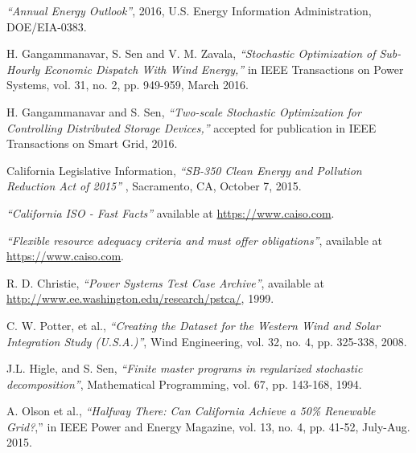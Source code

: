 \newpage
\begin{thebibliography}{9}

    \emph{``Annual Energy Outlook''}, 2016, U.S. Energy Information Administration, DOE/EIA-0383.

	H. Gangammanavar, S. Sen and V. M. Zavala, \emph{``Stochastic Optimization of Sub-Hourly Economic Dispatch With Wind Energy,''} in IEEE Transactions on Power Systems, vol. 31, no. 2, pp. 949-959, March 2016.

 H. Gangammanavar and S. Sen, \emph{``Two-scale Stochastic Optimization for Controlling
Distributed Storage Devices,''} accepted for publication in IEEE Transactions on Smart Grid, 2016.

  California Legislative Information, \emph{``SB-350 Clean Energy and Pollution Reduction Act of 2015''} , Sacramento, CA, October 7, 2015.

 \emph{``California ISO - Fast Facts''} available at \href{https://www.caiso.com/Documents/FlexibleResourcesHelpRenewables_FastFacts.pdf}{https://www.caiso.com}.

 \emph{``Flexible resource adequacy criteria and must offer obligations''}, available at \href{https://www.caiso.com/informed/Pages/StakeholderProcesses/FlexibleResourceAdequacyCriteria-MustOfferObligations.aspx} {https://www.caiso.com}.

 R. D. Christie, \emph{``Power Systems Test Case Archive''}, available at \href{http://www.ee.washington.edu/research/pstca/} {http://www.ee.washington.edu/research/pstca/}, 1999.

 C. W. Potter, et al., \emph{``Creating the Dataset for the Western Wind and Solar Integration Study ({U}.{S}.{A}.)''}, Wind Engineering, vol. 32, no. 4, pp. 325-338, 2008.

 J.L. Higle, and S. Sen, \emph{``Finite master programs in regularized stochastic decomposition''}, Mathematical Programming, vol. 67, pp. 143-168, 1994.

 A. Olson et al., \emph{``Halfway There: Can California Achieve a 50\% Renewable Grid?},'' in IEEE Power and Energy Magazine, vol. 13, no. 4, pp. 41-52, July-Aug. 2015.

\end{thebibliography}

\newpage


